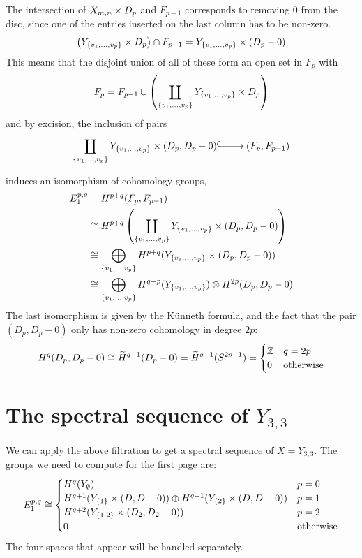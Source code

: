 The intersection of $X_{m,n}\times D_p$ and $F_{p-1}$ corresponds to
removing 0 from the disc, since one of the entries inserted on the
last column has to be non-zero.
\[ \left(Y_{\left\{ v_1,\dots,v_p \right\}}\times D_p \right) \cap F_{p-1} =
Y_{\left\{ v_1,\dots,v_p \right\}} \times \left(D_p-0\right) \]
This means that the disjoint union of all of these form an open set in
$F_p$ with
\[ F_p = F_{p-1}\cup \left(\coprod_{\left\{ v_1,\dots,v_p \right\}}
Y_{\left\{ v_1,\dots,v_p \right\}}\times D_p\right) \]
and by excision, the inclusion of pairs
\[ \xymatrix{ \displaystyle \coprod_{\set{v_1,\dots,v_p}}
  Y_{\set{v_1,\dots,v_p}}\times (D_p,D_p-0) \ar@{^(->}[r] &
  (F_p,F_{p-1}) } \]
induces an isomorphism of cohomology groups,
\begin{align*}
  E_1^{p,q} &= H^{p+q}(F_p,F_{p-1}) \\
  &\cong H^{p+q}\left(\coprod_{\left\{ v_1,\dots,v_p \right\}}
    Y_{\left\{ v_1,\dots,v_p \right\}}\times (D_p,D_p-0)\right) \\   &\cong
  \bigoplus_{\left\{ v_1,\dots,v_p \right\}}
  H^{p+q}(Y_{\left\{ v_1,\dots,v_p \right\}}\times (D_p,D_p-0)) \\   &\cong
  \bigoplus_{\left\{ v_1,\dots,v_p \right\}}
  H^{q-p}(Y_{\left\{ v_1,\dots,v_p \right\}})\otimes H^{2p}(D_p,D_p-0) 
\end{align*}
The last isomorphism is given by the K\"unneth formula, and the fact
that the pair $(D_p,D_p-0)$ only has non-zero cohomology in degree
$2p$:
\[ H^q(D_p,D_p-0) \cong \widetilde H^{q-1}(D_p-0) = \widetilde
H^{q-1}(S^{2p-1}) =
\begin{cases}
  \mathbb{Z} & q = 2p \\
  0 & \text{otherwise}
\end{cases} \]


\section{The spectral sequence of $Y_{3,3}$}

We can apply the above filtration to get a spectral sequence of
$X=Y_{3,3}$. The groups we need to compute for the first page are:
\[ E_1^{p,q} \cong
\begin{cases}
  H^{q}(Y_\emptyset) & p=0 \\
  H^{q+1}(Y_{\left\{ 1 \right\}} \times (D,D-0)) \oplus H^{q+1}(Y_{\left\{ 2 \right\}} \times
  (D,D-0)) & p=1 \\
  H^{q+2}(Y_{\left\{ 1,2 \right\}}\times (D_2,D_2-0)) & p = 2 \\
  0 & \text{otherwise}
\end{cases} \]
The four spaces that appear will be handled separately.

